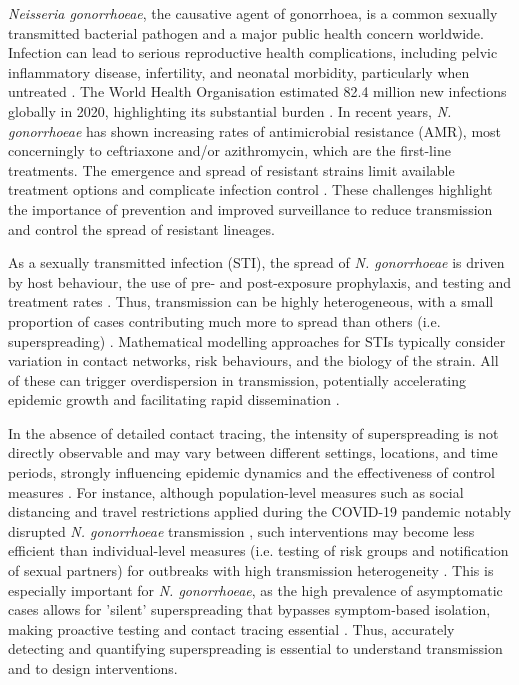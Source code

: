 \documentclass[lineno,pdflatex,sn-nature]{sn-jnl}%
\theoremstyle{thmstyleone}%
\theoremstyle{thmstyletwo}%
\theoremstyle{thmstylethree}%
\begin{document}
\textit{Neisseria gonorrhoeae}, the causative agent of gonorrhoea, is a common sexually transmitted bacterial pathogen and a major public health concern worldwide. Infection can lead to serious reproductive health complications, including pelvic inflammatory disease, infertility, and neonatal morbidity, particularly when untreated \cite{RefWorks:unemo2019gonorrhoea}. The World Health Organisation estimated 82.4 million new infections globally in 2020, highlighting its substantial burden \cite{RefWorks:2021global}. In recent years, \textit{N. gonorrhoeae} has shown increasing rates of antimicrobial resistance (AMR), most concerningly to ceftriaxone and/or azithromycin, which are the first-line treatments. The emergence and spread of resistant strains limit available treatment options and complicate infection control \cite{RefWorks:jensen2024antimicrobial}. These challenges highlight the importance of prevention and improved surveillance to reduce transmission and control the spread of resistant lineages.\newline

As a sexually transmitted infection (STI), the spread of \textit{N. gonorrhoeae} is driven by host behaviour, the use of pre- and post-exposure prophylaxis, and testing and treatment rates \cite{RefWorks:unemo2019gonorrhoea, vanWees2022quantifying}. Thus, transmission can be highly heterogeneous, with a small proportion of cases contributing much more to spread than others (i.e. superspreading) \cite{RefWorks:woolhouse1997heterogeneities, RefWorks:lilith2019dynamic}. Mathematical modelling approaches for STIs typically consider variation in contact networks, risk behaviours, and the biology of the strain. All of these can trigger overdispersion in transmission, potentially accelerating epidemic growth and facilitating rapid dissemination \cite{RefWorks:lloyd-smith2005superspreading, RefWorks:grassly2008mathematical, RefWorks:fraser2004factors, Althouse2020Superspreading}. \newline

In the absence of detailed contact tracing, the intensity of superspreading is not directly observable and may vary between different settings, locations, and time periods, strongly influencing epidemic dynamics and the effectiveness of control measures \cite{RefWorks:fraser2004factors}. For instance, although population-level measures such as social distancing and travel restrictions applied during the COVID-19 pandemic notably disrupted \textit{N. gonorrhoeae} transmission \cite{Golparian2024antimicrobial}, such interventions may become less efficient than individual-level measures (i.e. testing of risk groups and notification of sexual partners) for outbreaks with high transmission heterogeneity \cite{RefWorks:lloyd-smith2005superspreading, vanWees2022quantifying}. This is especially important for \textit{N. gonorrhoeae}, as the high prevalence of asymptomatic cases allows for 'silent' superspreading that bypasses symptom-based isolation, making proactive testing and contact tracing essential \cite{RefWorks:fraser2004factors, Williams2023frequent, Martn-Snchez2020clinical}. Thus, accurately detecting and quantifying superspreading is essential to understand transmission and to design interventions.
\newline
\end{document}
